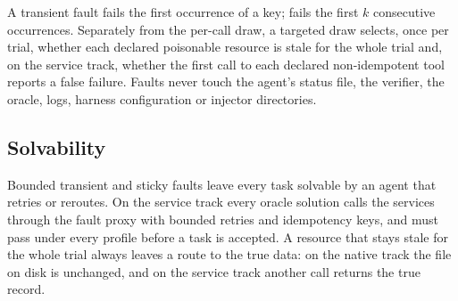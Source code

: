 A transient fault fails the first occurrence of a key;  fails the first $k$ consecutive occurrences.
Separately from the per-call draw, a targeted draw selects, once per trial, whether each declared poisonable resource is stale for the whole trial and, on the service track, whether the first call to each declared non-idempotent tool reports a false failure.
Faults never touch the agent's status file, the verifier, the oracle, logs, harness configuration or injector directories.

\subsection{Solvability}

Bounded transient and sticky faults leave every task solvable by an agent that retries or reroutes.
On the service track every oracle solution calls the services through the fault proxy with bounded retries and idempotency keys, and must pass under every profile before a task is accepted.
A resource that stays stale for the whole trial always leaves a route to the true data: on the native track the file on disk is unchanged, and on the service track another call returns the true record.
